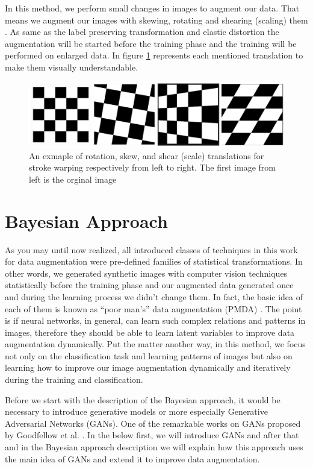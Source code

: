 In this method, we perform small changes in images to augment our data.  That means we augment our
images with skewing, rotating and shearing (scaling) them \cite{storke_warping_1997_source}. As same as the
label preserving transformation and elastic distortion the augmentation will be started before the
training phase and the training will be performed on enlarged data. In figure
\ref{fig:stroke_warping_transforamtions} represents each mentioned translation to make them visually
understandable.

\begin{figure}
  \centering
  \label{fig:stroke_warping_transforamtions}
  \includegraphics[width=1\textwidth]{fig/stroke_warping_transforamtions}
  \caption{An exmaple of rotation, skew, and shear (scale) translations for stroke warping respectively from left to right. The first image from left is the orginal image \cite{TODO-Augmentaion}}
\end{figure}


\section{Bayesian Approach}
\label{tit:bayesian-approach}
As you may until now realized, all introduced classes of techniques in this work for data
augmentation were pre-defined families of statistical transformations. In other words, we generated
synthetic images with computer vision techniques statistically before the training phase and our
augmented data generated once and during the learning process we didn't change them. In fact, the basic idea of each of
them is known as “poor man’s” data augmentation (PMDA) \cite{poor_man_data_augmentation}. The point
is if neural networks, in general, can learn such complex relations and patterns in images,
therefore they should be able to learn latent variables to improve data augmentation dynamically.
Put the matter another way, in this method, we focus not only on the classification task and
learning patterns of images but also on learning how to improve our image augmentation dynamically
and iteratively during the training and classification.

Before we start with the description of the Bayesian approach, it would be necessary to introduce
generative models or more especially Generative Adversarial Networks (GANs). One of the remarkable
works on GANs proposed by Goodfellow et al. \cite{TODO}. In the below first, we
will introduce GANs and after that and in the Bayesian approach description we will explain how this
approach uses the main idea of GANs and extend it to improve data augmentation.

